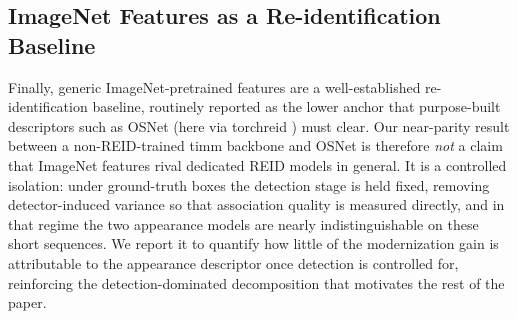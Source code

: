 \subsection{ImageNet Features as a Re-identification Baseline}

Finally, generic ImageNet-pretrained features are a well-established re-identification baseline, routinely reported as the lower anchor that purpose-built descriptors such as OSNet \cite{zhou2019osnet} (here via torchreid \cite{zhou2019torchreid}) must clear. Our near-parity result between a non-REID-trained timm backbone \cite{wightman2019timm} and OSNet is therefore \emph{not} a claim that ImageNet features rival dedicated REID models in general. It is a controlled isolation: under ground-truth boxes the detection stage is held fixed, removing detector-induced variance so that association quality is measured directly, and in that regime the two appearance models are nearly indistinguishable on these short sequences. We report it to quantify how little of the modernization gain is attributable to the appearance descriptor once detection is controlled for, reinforcing the detection-dominated decomposition that motivates the rest of the paper.
